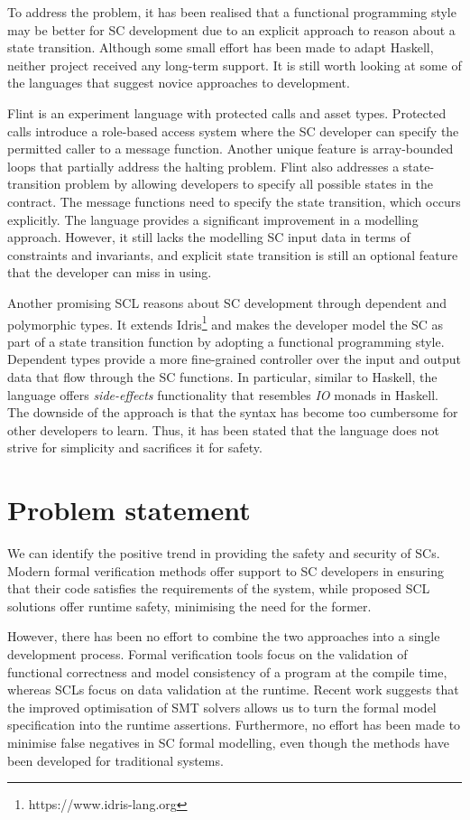 \documentclass[oneside]{ecsproject}     %
\begin{document}
To address the problem, it has been realised that a functional programming style may be better for SC development due to
an explicit approach to reason about a state transition. Although some small effort has been made to adapt Haskell, neither project received any long-term support. It is still worth looking at some of the languages that suggest novice approaches to development. 

Flint is an experiment language with protected calls and asset types\cite{flint}. Protected calls introduce a role-based access system
where the SC developer can specify the permitted caller to a message function. Another unique feature is array-bounded loops
that partially address the halting problem. Flint also addresses a state-transition problem by allowing developers to specify
all possible states in the contract. The message functions need to specify the state transition, which occurs explicitly.
The language provides a significant improvement in a modelling approach. However, it still lacks the modelling SC input data in terms
of constraints and invariants, and explicit state transition is still an optional feature that the developer can miss in using.

Another promising SCL reasons about SC development through dependent and polymorphic types\cite{idris}. It extends Idris\footnote{https://www.idris-lang.org} 
and makes the developer model the SC as part of a state transition function by adopting a functional programming style. Dependent types provide a more
fine-grained controller over the input and output data that flow through the SC functions. In particular, similar to Haskell, the language offers \textit{side-effects} 
functionality that resembles \textit{IO} monads in Haskell. The downside of the approach is that the syntax has become too cumbersome for other developers to learn. Thus,
it has been stated that the language does not strive for simplicity and sacrifices it for safety.


\section{Problem statement}

We can identify the positive trend in providing the safety and security of SCs.
Modern formal verification methods offer support to SC developers in ensuring that their code satisfies the requirements of the system, while
proposed SCL solutions offer runtime safety, minimising the need for the former.

However, there has been no effort to combine the two approaches into a single development process. Formal verification tools
focus on the validation of functional correctness and model consistency of a program at the compile time, whereas SCLs focus on data validation 
at the runtime. Recent work suggests that the improved optimisation of SMT solvers allows us to turn the formal model specification into 
the runtime assertions\cite{runtime_assert}. Furthermore, no effort has been made to minimise false negatives in SC formal modelling, 
even though the methods have been developed for traditional systems\cite{event_b}.
\end{document}
